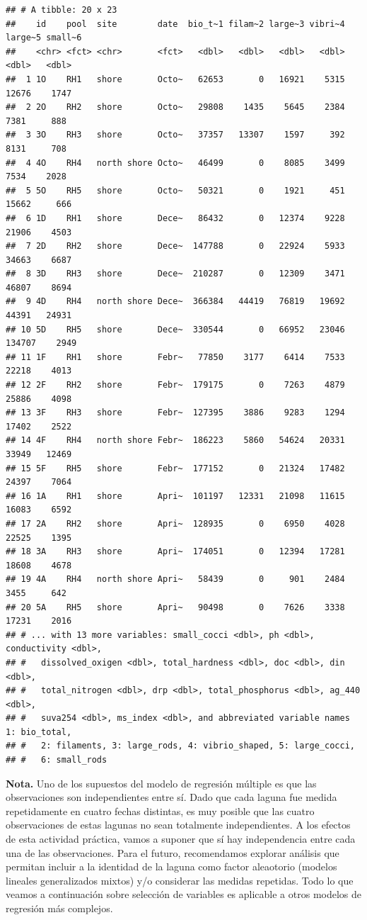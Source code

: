 \documentclass[
]{book}
\begin{document}
\begin{verbatim}
## # A tibble: 20 x 23
##    id    pool  site        date  bio_t~1 filam~2 large~3 vibri~4 large~5 small~6
##    <chr> <fct> <chr>       <fct>   <dbl>   <dbl>   <dbl>   <dbl>   <dbl>   <dbl>
##  1 1O    RH1   shore       Octo~   62653       0   16921    5315   12676    1747
##  2 2O    RH2   shore       Octo~   29808    1435    5645    2384    7381     888
##  3 3O    RH3   shore       Octo~   37357   13307    1597     392    8131     708
##  4 4O    RH4   north shore Octo~   46499       0    8085    3499    7534    2028
##  5 5O    RH5   shore       Octo~   50321       0    1921     451   15662     666
##  6 1D    RH1   shore       Dece~   86432       0   12374    9228   21906    4503
##  7 2D    RH2   shore       Dece~  147788       0   22924    5933   34663    6687
##  8 3D    RH3   shore       Dece~  210287       0   12309    3471   46807    8694
##  9 4D    RH4   north shore Dece~  366384   44419   76819   19692   44391   24931
## 10 5D    RH5   shore       Dece~  330544       0   66952   23046  134707    2949
## 11 1F    RH1   shore       Febr~   77850    3177    6414    7533   22218    4013
## 12 2F    RH2   shore       Febr~  179175       0    7263    4879   25886    4098
## 13 3F    RH3   shore       Febr~  127395    3886    9283    1294   17402    2522
## 14 4F    RH4   north shore Febr~  186223    5860   54624   20331   33949   12469
## 15 5F    RH5   shore       Febr~  177152       0   21324   17482   24397    7064
## 16 1A    RH1   shore       Apri~  101197   12331   21098   11615   16083    6592
## 17 2A    RH2   shore       Apri~  128935       0    6950    4028   22525    1395
## 18 3A    RH3   shore       Apri~  174051       0   12394   17281   18608    4678
## 19 4A    RH4   north shore Apri~   58439       0     901    2484    3455     642
## 20 5A    RH5   shore       Apri~   90498       0    7626    3338   17231    2016
## # ... with 13 more variables: small_cocci <dbl>, ph <dbl>, conductivity <dbl>,
## #   dissolved_oxigen <dbl>, total_hardness <dbl>, doc <dbl>, din <dbl>,
## #   total_nitrogen <dbl>, drp <dbl>, total_phosphorus <dbl>, ag_440 <dbl>,
## #   suva254 <dbl>, ms_index <dbl>, and abbreviated variable names 1: bio_total,
## #   2: filaments, 3: large_rods, 4: vibrio_shaped, 5: large_cocci,
## #   6: small_rods
\end{verbatim}

\textbf{Nota.} Uno de los supuestos del modelo de regresión múltiple es que las observaciones son independientes entre sí. Dado que cada laguna fue medida repetidamente en cuatro fechas distintas, es muy posible que las cuatro observaciones de estas lagunas no sean totalmente independientes. A los efectos de esta actividad práctica, vamos a suponer que sí hay independencia entre cada una de las observaciones. Para el futuro, recomendamos explorar análisis que permitan incluir a la identidad de la laguna como factor aleaotorio (modelos lineales generalizados mixtos) y/o considerar las medidas repetidas. Todo lo que veamos a continuación sobre selección de variables es aplicable a otros modelos de regresión más complejos.
\end{document}
